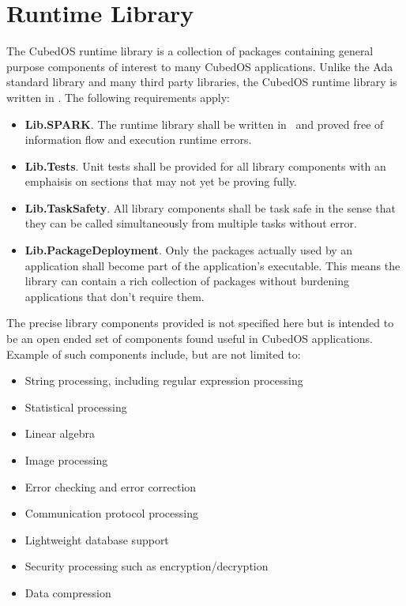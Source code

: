 \section{Runtime Library}
\label{sec:runtime-library}

The CubedOS runtime library is a collection of packages containing general purpose components of
interest to many CubedOS applications. Unlike the Ada standard library and many third party
libraries, the CubedOS runtime library is written in \SPARK. The following requirements apply:

\begin{itemize}
\item \textbf{Lib.SPARK}. The runtime library shall be written in \SPARK\ and proved free of
  information flow and execution runtime errors.
\item \textbf{Lib.Tests}. Unit tests shall be provided for all library components with an
  emphaisis on sections that may not yet be proving fully.
\item \textbf{Lib.TaskSafety}. All library components shall be task safe in the sense that they
  can be called simultaneously from multiple tasks without error.
\item \textbf{Lib.PackageDeployment}. Only the packages actually used by an application shall
  become part of the application's executable. This means the library can contain a rich
  collection of packages without burdening applications that don't require them.
\end{itemize}

The precise library components provided is not specified here but is intended to be an open
ended set of components found useful in CubedOS applications. Example of such components
include, but are not limited to:

\begin{itemize}
\item String processing, including regular expression processing
\item Statistical processing
\item Linear algebra
\item Image processing
\item Error checking and error correction
\item Communication protocol processing
\item Lightweight database support
\item Security processing such as encryption/decryption
\item Data compression
\end{itemize}

